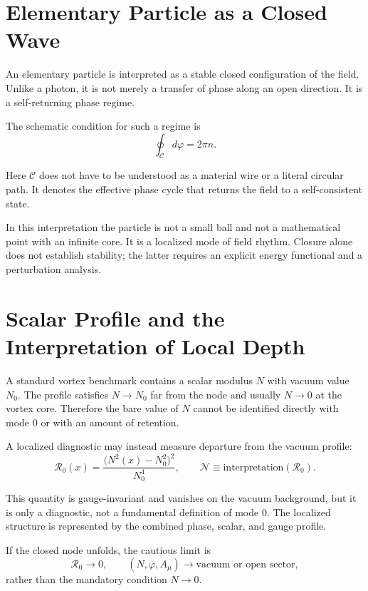 \documentclass[11pt,a4paper]{article}
\newcommand{\phase}{\varphi}
\newcommand{\normal}{\mathcal{N}}
\newcommand{\contour}{\mathcal{C}}
\begin{document}
\section{Elementary Particle as a Closed Wave}

An elementary particle is interpreted as a stable closed configuration of the field. Unlike a photon, it is not merely a transfer of phase along an open direction. It is a self-returning phase regime.

The schematic condition for such a regime is
\begin{equation}
\oint_{\contour} d\phase = 2\pi n.
\end{equation}

Here $\contour$ does not have to be understood as a material wire or a literal circular path. It denotes the effective phase cycle that returns the field to a self-consistent state.

In this interpretation the particle is not a small ball and not a mathematical point with an infinite core. It is a localized mode of field rhythm. Closure alone does not establish stability; the latter requires an explicit energy functional and a perturbation analysis.

\section{Scalar Profile and the Interpretation of Local Depth}

A standard vortex benchmark contains a scalar modulus $N$ with vacuum value $N_0$. The profile satisfies $N\to N_0$ far from the node and usually $N\to0$ at the vortex core. Therefore the bare value of $N$ cannot be identified directly with mode $0$ or with an amount of retention.

A localized diagnostic may instead measure departure from the vacuum profile:
\begin{equation}
\mathcal{R}_0(x)
=\frac{\bigl(N^2(x)-N_0^2\bigr)^2}{N_0^4},
\qquad
\normal\equiv\text{interpretation}(\mathcal{R}_0).
\end{equation}

This quantity is gauge-invariant and vanishes on the vacuum background, but it is only a diagnostic, not a fundamental definition of mode $0$. The localized structure is represented by the combined phase, scalar, and gauge profile.

If the closed node unfolds, the cautious limit is
\begin{equation}
\mathcal{R}_0\to0,
\qquad
(N,\phase,A_\mu)\to\text{vacuum or open sector},
\end{equation}
rather than the mandatory condition $N\to0$.
\end{document}
